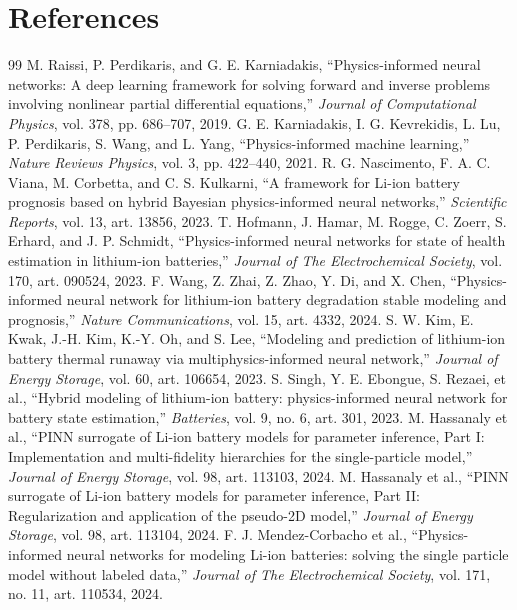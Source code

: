 \documentclass[14pt,a4paper,oneside]{extreport}
\begin{document}
\chapter*{References}
\begin{thebibliography}{99}
 M. Raissi, P. Perdikaris, and G. E. Karniadakis, ``Physics-informed neural networks: A deep learning framework for solving forward and inverse problems involving nonlinear partial differential equations,'' \emph{Journal of Computational Physics}, vol. 378, pp. 686--707, 2019.
 G. E. Karniadakis, I. G. Kevrekidis, L. Lu, P. Perdikaris, S. Wang, and L. Yang, ``Physics-informed machine learning,'' \emph{Nature Reviews Physics}, vol. 3, pp. 422--440, 2021.
 R. G. Nascimento, F. A. C. Viana, M. Corbetta, and C. S. Kulkarni, ``A framework for Li-ion battery prognosis based on hybrid Bayesian physics-informed neural networks,'' \emph{Scientific Reports}, vol. 13, art. 13856, 2023.
 T. Hofmann, J. Hamar, M. Rogge, C. Zoerr, S. Erhard, and J. P. Schmidt, ``Physics-informed neural networks for state of health estimation in lithium-ion batteries,'' \emph{Journal of The Electrochemical Society}, vol. 170, art. 090524, 2023.
 F. Wang, Z. Zhai, Z. Zhao, Y. Di, and X. Chen, ``Physics-informed neural network for lithium-ion battery degradation stable modeling and prognosis,'' \emph{Nature Communications}, vol. 15, art. 4332, 2024.
 S. W. Kim, E. Kwak, J.-H. Kim, K.-Y. Oh, and S. Lee, ``Modeling and prediction of lithium-ion battery thermal runaway via multiphysics-informed neural network,'' \emph{Journal of Energy Storage}, vol. 60, art. 106654, 2023.
 S. Singh, Y. E. Ebongue, S. Rezaei, et al., ``Hybrid modeling of lithium-ion battery: physics-informed neural network for battery state estimation,'' \emph{Batteries}, vol. 9, no. 6, art. 301, 2023.
 M. Hassanaly et al., ``PINN surrogate of Li-ion battery models for parameter inference, Part I: Implementation and multi-fidelity hierarchies for the single-particle model,'' \emph{Journal of Energy Storage}, vol. 98, art. 113103, 2024.
 M. Hassanaly et al., ``PINN surrogate of Li-ion battery models for parameter inference, Part II: Regularization and application of the pseudo-2D model,'' \emph{Journal of Energy Storage}, vol. 98, art. 113104, 2024.
 F. J. Mendez-Corbacho et al., ``Physics-informed neural networks for modeling Li-ion batteries: solving the single particle model without labeled data,'' \emph{Journal of The Electrochemical Society}, vol. 171, no. 11, art. 110534, 2024.

\end{thebibliography}
\end{document}
